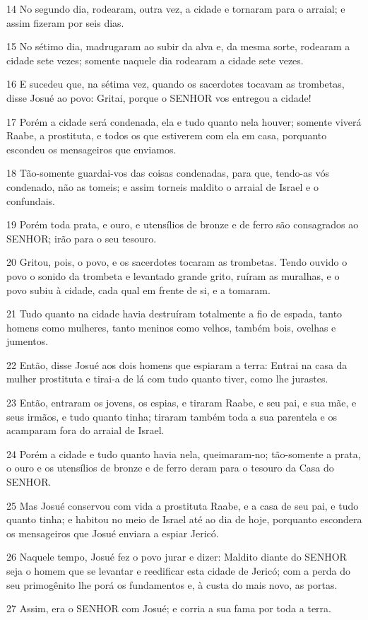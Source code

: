 \par 14 No segundo dia, rodearam, outra vez, a cidade e tornaram para o arraial; e assim fizeram por seis dias.
\par 15 No sétimo dia, madrugaram ao subir da alva e, da mesma sorte, rodearam a cidade sete vezes; somente naquele dia rodearam a cidade sete vezes.
\par 16 E sucedeu que, na sétima vez, quando os sacerdotes tocavam as trombetas, disse Josué ao povo: Gritai, porque o SENHOR vos entregou a cidade!
\par 17 Porém a cidade será condenada, ela e tudo quanto nela houver; somente viverá Raabe, a prostituta, e todos os que estiverem com ela em casa, porquanto escondeu os mensageiros que enviamos.
\par 18 Tão-somente guardai-vos das coisas condenadas, para que, tendo-as vós condenado, não as tomeis; e assim torneis maldito o arraial de Israel e o confundais.
\par 19 Porém toda prata, e ouro, e utensílios de bronze e de ferro são consagrados ao SENHOR; irão para o seu tesouro.
\par 20 Gritou, pois, o povo, e os sacerdotes tocaram as trombetas. Tendo ouvido o povo o sonido da trombeta e levantado grande grito, ruíram as muralhas, e o povo subiu à cidade, cada qual em frente de si, e a tomaram.
\par 21 Tudo quanto na cidade havia destruíram totalmente a fio de espada, tanto homens como mulheres, tanto meninos como velhos, também bois, ovelhas e jumentos.
\par 22 Então, disse Josué aos dois homens que espiaram a terra: Entrai na casa da mulher prostituta e tirai-a de lá com tudo quanto tiver, como lhe jurastes.
\par 23 Então, entraram os jovens, os espias, e tiraram Raabe, e seu pai, e sua mãe, e seus irmãos, e tudo quanto tinha; tiraram também toda a sua parentela e os acamparam fora do arraial de Israel.
\par 24 Porém a cidade e tudo quanto havia nela, queimaram-no; tão-somente a prata, o ouro e os utensílios de bronze e de ferro deram para o tesouro da Casa do SENHOR.
\par 25 Mas Josué conservou com vida a prostituta Raabe, e a casa de seu pai, e tudo quanto tinha; e habitou no meio de Israel até ao dia de hoje, porquanto escondera os mensageiros que Josué enviara a espiar Jericó.
\par 26 Naquele tempo, Josué fez o povo jurar e dizer: Maldito diante do SENHOR seja o homem que se levantar e reedificar esta cidade de Jericó; com a perda do seu primogênito lhe porá os fundamentos e, à custa do mais novo, as portas.
\par 27 Assim, era o SENHOR com Josué; e corria a sua fama por toda a terra.

